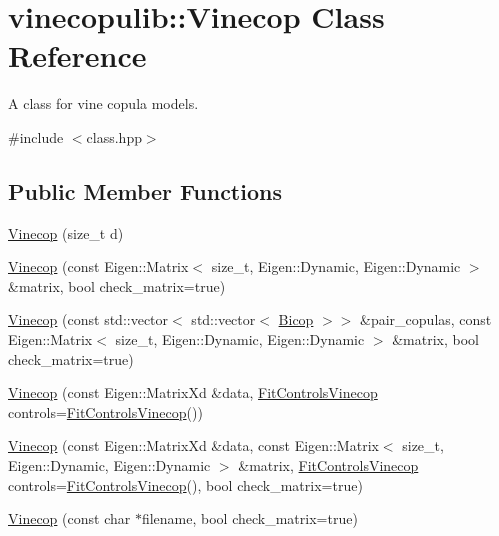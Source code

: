 \hypertarget{classvinecopulib_1_1_vinecop}{}\section{vinecopulib\+:\+:Vinecop Class Reference}
\label{classvinecopulib_1_1_vinecop}


A class for vine copula models.  




{\ttfamily \#include $<$class.\+hpp$>$}

\subsection*{Public Member Functions}
\begin{DoxyCompactItemize}
\item 
\hyperlink{classvinecopulib_1_1_vinecop_a391541e2795d06a848d5a17fe3496a63}{Vinecop} (size\+\_\+t d)
\item 
\hyperlink{classvinecopulib_1_1_vinecop_a9aa43135a9319e20573a72f01c82cd3b}{Vinecop} (const Eigen\+::\+Matrix$<$ size\+\_\+t, Eigen\+::\+Dynamic, Eigen\+::\+Dynamic $>$ \&matrix, bool check\+\_\+matrix=true)
\item 
\hyperlink{classvinecopulib_1_1_vinecop_a48f302a8c97dce27619b70aeb257fe96}{Vinecop} (const std\+::vector$<$ std\+::vector$<$ \hyperlink{classvinecopulib_1_1_bicop}{Bicop} $>$$>$ \&pair\+\_\+copulas, const Eigen\+::\+Matrix$<$ size\+\_\+t, Eigen\+::\+Dynamic, Eigen\+::\+Dynamic $>$ \&matrix, bool check\+\_\+matrix=true)
\item 
\hyperlink{classvinecopulib_1_1_vinecop_a1bba8d207a21b5d0c76660af40383822}{Vinecop} (const Eigen\+::\+Matrix\+Xd \&data, \hyperlink{classvinecopulib_1_1_fit_controls_vinecop}{Fit\+Controls\+Vinecop} controls=\hyperlink{classvinecopulib_1_1_fit_controls_vinecop}{Fit\+Controls\+Vinecop}())
\item 
\hyperlink{classvinecopulib_1_1_vinecop_aa38ebdd3582482fad7d1ace027a9c162}{Vinecop} (const Eigen\+::\+Matrix\+Xd \&data, const Eigen\+::\+Matrix$<$ size\+\_\+t, Eigen\+::\+Dynamic, Eigen\+::\+Dynamic $>$ \&matrix, \hyperlink{classvinecopulib_1_1_fit_controls_vinecop}{Fit\+Controls\+Vinecop} controls=\hyperlink{classvinecopulib_1_1_fit_controls_vinecop}{Fit\+Controls\+Vinecop}(), bool check\+\_\+matrix=true)
\item 
\hyperlink{classvinecopulib_1_1_vinecop_ad6ab9327b34a6e7fe4e8fcb0e8cf0d82}{Vinecop} (const char $\ast$filename, bool check\+\_\+matrix=true)
$$
\end{DoxyCompactItemize}
